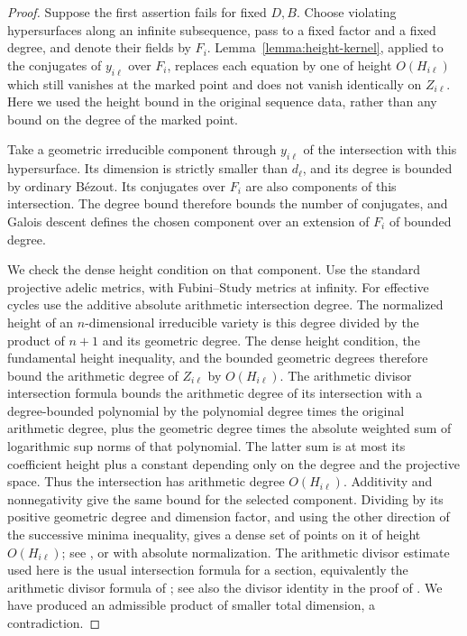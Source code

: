 \begin{proof}
Suppose the first assertion fails for fixed $D,B$.  Choose violating
hypersurfaces along an infinite subsequence, pass to a fixed factor and
a fixed degree, and denote their fields by $F_i$.
Lemma~\ref{lemma:height-kernel}, applied to the
conjugates of $y_{i\ell}$ over $F_i$, replaces each equation by one
of height $O(H_{i\ell})$ which still vanishes at the marked point
and does not vanish identically on $Z_{i\ell}$.  Here we used the
height bound in the original sequence data, rather than any bound
on the degree of the marked point.

Take a geometric irreducible component through $y_{i\ell}$ of the
intersection with this hypersurface.  Its dimension is strictly
smaller than $d_\ell$, and its degree is bounded by ordinary
B\'ezout.  Its conjugates over $F_i$ are also components of this
intersection.  The degree bound therefore bounds the number of
conjugates, and Galois descent defines the chosen component over
an extension of $F_i$ of bounded degree.

We check the dense height condition on that component.  Use the
standard projective adelic metrics, with Fubini--Study metrics at
infinity.  For effective cycles use the additive absolute arithmetic
intersection degree.  The normalized height of an $n$-dimensional
irreducible variety is this degree divided by the product of $n+1$ and
its geometric degree.  The dense height condition, the fundamental height
inequality, and the bounded geometric degrees therefore bound the
arithmetic degree of $Z_{i\ell}$ by $O(H_{i\ell})$.
The arithmetic divisor intersection formula bounds the arithmetic degree
of its intersection with a degree-bounded polynomial by the polynomial
degree times the original arithmetic degree, plus the geometric degree
times the absolute weighted sum of logarithmic sup norms of that
polynomial.  The
latter sum is at most its coefficient height plus a constant
depending only on the degree and the projective space.  Thus the
intersection has arithmetic degree $O(H_{i\ell})$.  Additivity and
nonnegativity give the same bound for the selected component.
Dividing by its positive geometric degree and dimension factor, and
using the other direction of the successive minima inequality, gives a
dense set of points on it of height
$O(H_{i\ell})$; see \cite[Theorem~1.10]{Zhang1995}, or
\cite[Theorem~5.3.3]{YuanZhang2021} with absolute normalization.
The arithmetic divisor estimate used here is the usual
intersection formula for a section, equivalently the
arithmetic divisor formula of
\cite[Proposition~3.2.1(iv), Equation~(3.2.2)]{BostGilletSoule1994};
see also the divisor identity in the proof of
\cite[Corollary~A.4.3]{YuanZhang2021}.
We have produced an admissible product of smaller total dimension,
a contradiction.


\end{proof}
